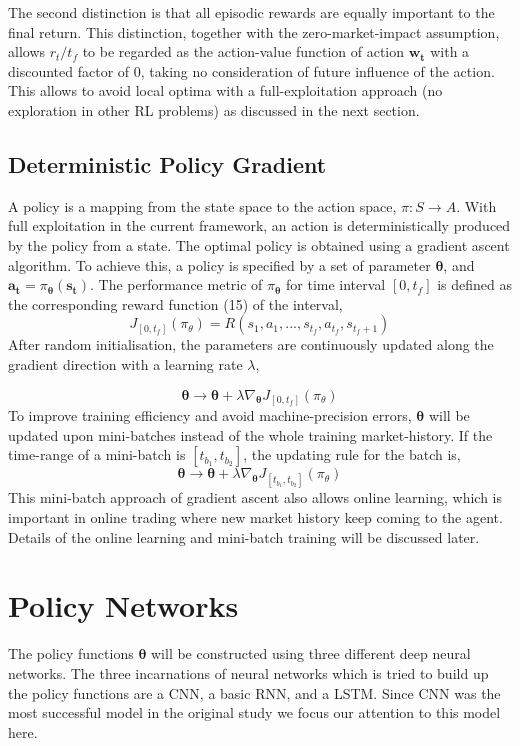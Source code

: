 \documentclass[journal,onecolumn]{IEEEtran}
\newcommand{\vc}[1]{\mathbf{#1}}
\begin{document}
The second distinction is that all episodic rewards are equally important to the final return. This distinction, together with the zero-market-impact assumption, allows $r_t /t_f$ to be regarded as the action-value function of action $\vc{w_t}$ with a discounted factor of 0, taking
no consideration of future influence of the action. This allows to avoid local optima with a full-exploitation approach (no exploration in other RL problems) as discussed in the next section.
\subsection{Deterministic Policy Gradient}
A policy is a mapping from the state space to the action space, $\pi : S \rightarrow A$. With full exploitation in the current framework, an action is deterministically produced by the policy from a state. The optimal policy is obtained using a gradient ascent algorithm. To achieve this, a policy is specified by a set of parameter $\vc{\theta}$, and $\vc{a_t} = \pi_{\vc{\theta}}(\vc{s_t} )$. The performance metric of $\pi_{\vc{\theta}}$ for time interval $[0, t_f ]$ is defined as the corresponding reward function (15) of the interval,
\begin{equation}
	J_{[0,t_f]}(\pi_{\theta})  = R(s_1, a_1,..., s_{t_f} , a_{t_f} , s_{t_f +1} )
\end{equation}
After random initialisation, the parameters are continuously updated along the gradient direction with a learning rate $\lambda$,

\begin{equation}
	\vc{\theta} \rightarrow \vc{\theta}+\lambda \nabla_{\vc{\theta}}J_{[0,t_f]}(\pi_{\theta})
\end{equation}
To improve training efficiency and avoid machine-precision errors, $\vc{\theta}$ will be updated upon mini-batches instead of the whole training market-history. If the time-range of a mini-batch is $[t_{b_1} , t_{b_2}]$, the updating rule for the batch is,
\begin{equation}
\vc{\theta} \rightarrow \vc{\theta}+\lambda \nabla_{\vc{\theta}}J_{[t_{b_1} , t_{b_2}]}(\pi_{\theta})
\end{equation}
This mini-batch approach of gradient ascent also allows online learning, which is important in online trading where new market history keep coming to the agent. Details of the online learning and mini-batch training will be discussed later.
\section{Policy Networks}
The policy functions $\vc{\theta}$ will be constructed using three different deep neural networks.
The three incarnations of neural networks which is tried to build up the policy functions are a CNN, a basic RNN, and a LSTM. Since CNN was the most successful model in the original study we focus our attention to this model here.
\end{document}
